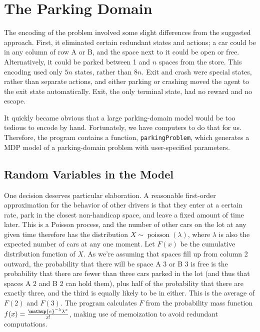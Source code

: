 \documentclass[paper=letter,pagesize=automedia,twoside=false,12pt]{scrartcl}
\theoremstyle{plain}%
\theoremstyle{definition}
\theoremstyle{remark}
\newcommand{\eu}{\ensuremath\mathup{e}}
\begin{document}
\section{The Parking Domain}\label{sec:parking}

The encoding of the problem involved some slight differences from the suggested approach.  First, it eliminated certain redundant states and actions; a car could be in any column of row A or B, and the space next to it could be open or free.  Alternatively, it could be parked between 1 and \(n\) spaces from the store.  This encoding used only \(5n\) states, rather than \(8n\).  Exit and crash were special states, rather than separate actions, and either parking or crashing moved the agent to the exit state automatically.  Exit, the only terminal state, had no reward and no escape.

It quickly became obvious that a large parking-domain model would be too tedious to encode by hand.  Fortunately, we have computers to do that for us.  Therefore, the program contains a function, \texttt{parkingProblem}, which generates a MDP model of a parking-domain problem with user-specified parameters.

\subsection{Random Variables in the Model}\label{sec:stochastic}

One decision deserves particular elaboration.  A reasonable first-order approximation for the behavior of other drivers is that they enter at a certain rate, park in the closest non-handicap space, and leave a fixed amount of time later.  This is a Poisson process, and the number of other cars on the lot at any given time therefore has the distribution \( X \sim \operatorname{poisson}(\lambda) \), where \(\lambda\) is also the expected number of cars at any one moment.  Let \(F(x)\) be the cumulative distribution function of \(X\). As we're assuming that spaces fill up from column 2 outward, the probability that there will be space A 3 or B 3 is free is the probability that there are fewer than three cars parked in the lot (and thus that spaces A 2 and B 2 can hold them), plus half of the probability that there are exactly three, and the third is equally likely to be in either.  This is the average of \(F(2)\) and \(F(3)\).  The program calculates \(F\) from the probability mass function \(f(x) = \frac{\eu^{-\lambda} \lambda^x}{x!} \), making use of memoization to avoid redundant computations.
\end{document}
